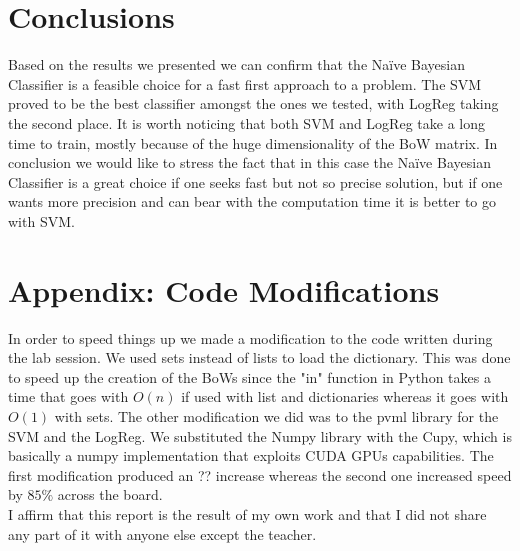 \documentclass[10pt,a4paper]{report}
\begin{document}
\section{Conclusions}
Based on the results we presented we can confirm that the Na\"{i}ve Bayesian Classifier is a feasible choice for a fast first approach to a problem. The SVM proved to be the best classifier amongst the ones we tested, with LogReg taking the second place. It is worth noticing that both SVM and LogReg take a long time to train, mostly because of the huge dimensionality of the BoW matrix. In conclusion we would like to stress the fact that in this case the Na\"{i}ve Bayesian Classifier is a great choice if one seeks fast but not so precise solution, but if one wants more precision and can bear with the computation time it is better to go with SVM. 
\section{Appendix: Code Modifications}
In order to speed things up we made a modification to the code written during the lab session. We used sets instead of lists to load the dictionary. This was done to speed up the creation of the BoWs since the "in" function in Python takes a time that goes with $O(n)$ if used with list and dictionaries whereas it goes with $O(1)$ with sets. The other modification we did was to the pvml library for the SVM and the LogReg. We substituted the Numpy library with the Cupy, which is basically a numpy implementation that exploits CUDA GPUs capabilities. The first modification produced an ?? increase whereas the second one increased speed by $85 \%$ across the board.
\vspace*{\fill}
\\
I affirm that this report is the result of my own work and that I did not share any part of it with anyone else except the teacher.
\\ \\ \\ \\ \\  
\end{document}
